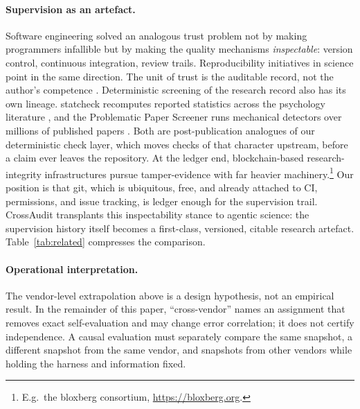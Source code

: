 \documentclass[11pt,letterpaper]{article}
\begin{document}
\paragraph{Supervision as an artefact.} Software engineering solved an analogous trust problem not by making programmers infallible but by making the quality mechanisms \emph{inspectable}: version control, continuous integration, review trails. Reproducibility initiatives in science point in the same direction. The unit of trust is the auditable record, not the author's competence \cite{baker2016}. Deterministic screening of the research record also has its own lineage. statcheck recomputes reported statistics across the psychology literature \cite{nuijten2016statcheck}, and the Problematic Paper Screener runs mechanical detectors over millions of published papers \cite{cabanac2022pps}. Both are post-publication analogues of our deterministic check layer, which moves checks of that character upstream, before a claim ever leaves the repository. At the ledger end, blockchain-based research-integrity infrastructures pursue tamper-evidence with far heavier machinery.\footnote{E.g.\ the bloxberg consortium, \url{https://bloxberg.org}.} Our position is that git, which is ubiquitous, free, and already attached to CI, permissions, and issue tracking, is ledger enough for the supervision trail. CrossAudit transplants this inspectability stance to agentic science: the supervision history itself becomes a first-class, versioned, citable research artefact. Table~\ref{tab:related} compresses the comparison.

\paragraph{Operational interpretation.} The vendor-level extrapolation above is a design hypothesis, not an empirical result. In the remainder of this paper, ``cross-vendor'' names an assignment that removes exact self-evaluation and may change error correlation; it does not certify independence. A causal evaluation must separately compare the same snapshot, a different snapshot from the same vendor, and snapshots from other vendors while holding the harness and information fixed.

\end{document}
